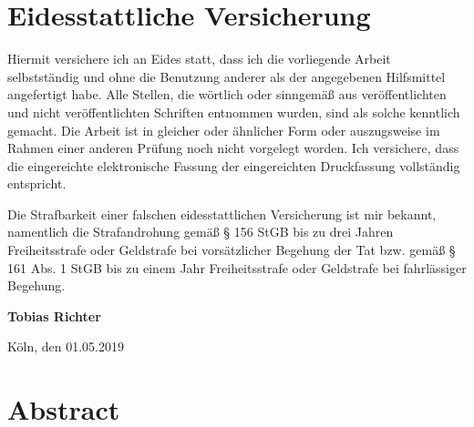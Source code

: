\documentclass[a4paper, 12pt]{article}
\begin{document}
\section*{Eidesstattliche Versicherung}
\label{sec:SOOA}

\vspace{2.5cm}


Hiermit versichere ich an Eides statt, dass ich die vorliegende Arbeit selbstständig und ohne die Benutzung anderer als der angegebenen Hilfsmittel angefertigt habe. Alle Stellen, die wörtlich oder sinngemäß aus veröffentlichten und nicht veröffentlichten Schriften entnommen wurden, sind als solche kenntlich gemacht. Die Arbeit ist in gleicher oder ähnlicher Form oder auszugsweise im Rahmen einer anderen Prüfung noch nicht vorgelegt worden. Ich versichere, dass die eingereichte elektronische Fassung der eingereichten Druckfassung vollständig entspricht.

\vspace{1cm}

\noindent
Die Strafbarkeit einer falschen eidesstattlichen Versicherung ist mir bekannt, namentlich die Strafandrohung gemäß § 156 StGB bis zu drei Jahren Freiheitsstrafe oder Geldstrafe bei vorsätzlicher Begehung der Tat bzw. gemäß § 161 Abs. 1 StGB bis zu einem Jahr Freiheitsstrafe oder Geldstrafe bei fahrlässiger Begehung.

\vspace{3cm}
\noindent
\textbf{Tobias Richter}

\vspace{0.5cm}
\noindent
Köln, den 01.05.2019
\clearpage
\thispagestyle{empty}
\vspace*{\fill} \section*{Abstract}
\end{document}
